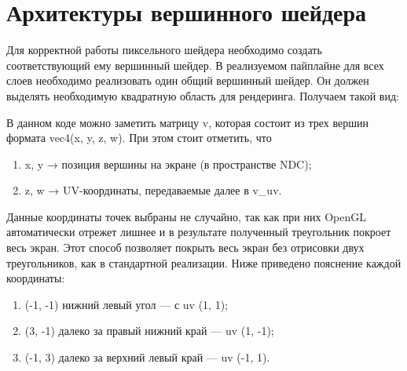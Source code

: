 \documentclass[a4paper,14pt]{extreport}
\begin{document}
        \section{Архитектуры вершинного шейдера}
            Для корректной работы пиксельного шейдера необходимо создать соответствующий ему вершинный шейдер. В реализуемом пайплайне для всех слоев необходимо реализовать один общий вершинный шейдер. Он должен выделять необходимую квадратную область для рендеринга. Получаем такой вид:

            

            В данном коде можно заметить матрицу v, которая состоит из трех вершин формата vec4(x, y, z, w). При этом стоит отметить, что
            \begin{enumerate}
                \item x, y → позиция вершины на экране (в пространстве NDC);
                \item z, w → UV-координаты, передаваемые далее в v\_uv.
            \end{enumerate}

            Данные координаты точек выбраны не случайно, так как при них OpenGL автоматически отрежет лишнее и в результате полученный треугольник покроет весь экран. Этот способ позволяет покрыть весь экран без отрисовки двух треугольников, как в стандартной реализации. Ниже приведено пояснение каждой координаты:
            \begin{enumerate}
                \item (-1, -1) нижний левый угол — с uv (1, 1);
                \item (3, -1) далеко за правый нижний край — uv (1, -1);
                \item (-1, 3) далеко за верхний левый край — uv (-1, 1).
            \end{enumerate}
            
\end{document}
